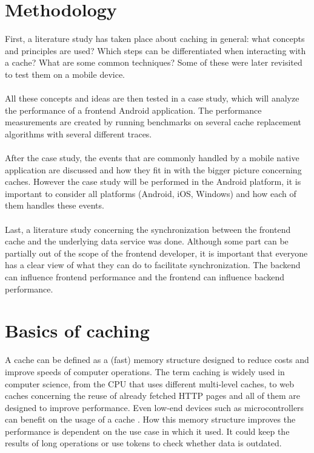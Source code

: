 \documentclass[pdftex,a4paper,12pt,twoside]{report}
\begin{document}
\chapter{Methodology}
\label{ch:methodology}
First, a literature study has taken place about caching in general: what concepts and principles are used? Which steps can be differentiated when interacting with a cache? What are some common techniques? Some of these were later revisited to test them on a mobile device.
\\\\
All these concepts and ideas are then tested in a case study, which will analyze the performance of a frontend Android application. The performance measurements are created by running benchmarks on several cache replacement algorithms with several different traces.
\\\\
After the case study, the events that are commonly handled by a mobile native application are discussed and how they fit in with the bigger picture concerning caches. However the case study will be performed in the Android platform, it is important to consider all platforms (Android, iOS, Windows) and how each of them handles these events.
\\\\
Last, a literature study concerning the synchronization between the frontend cache and the underlying data service was done. Although some part can be partially out of the scope of the frontend developer, it is important that everyone has a clear view of what they can do to facilitate synchronization. The backend can influence frontend performance and the frontend can influence backend performance.
\chapter{Basics of caching}
\label{ch:caching}
A cache can be defined as a (fast) memory structure designed to reduce costs and improve speeds of computer operations.
The term caching is widely used in computer science, from the CPU that uses different multi-level caches, to web caches concerning
the reuse of already fetched HTTP pages \citep{rfc2616} and all of them are designed to improve performance. Even low-end devices such as microcontrollers
can benefit on the usage of a cache \citep{extremetech_multilevelcache}. How this memory structure improves the performance
is dependent on the use case in which it used. It could keep the results of long operations or use tokens to check whether data is outdated.
\end{document}

